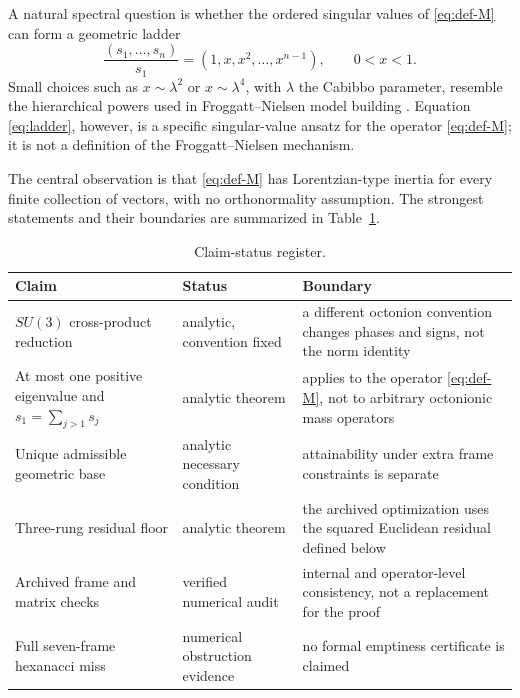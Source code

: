 \documentclass[11pt]{article}
\theoremstyle{remark}
\begin{document}
A natural spectral question is whether the ordered singular values of \eqref{eq:def-M} can form a geometric ladder
\begin{equation}
 \frac{(s_1,\ldots,s_n)}{s_1}=(1,x,x^2,\ldots,x^{n-1}),
 \qquad 0<x<1.
 \label{eq:ladder}
\end{equation}
Small choices such as $x\sim\lambda^2$ or $x\sim\lambda^4$, with $\lambda$ the Cabibbo parameter, resemble the hierarchical powers used in Froggatt--Nielsen model building \cite{FroggattNielsen1979,Wolfenstein1983}.  Equation \eqref{eq:ladder}, however, is a specific singular-value ansatz for the operator \eqref{eq:def-M}; it is not a definition of the Froggatt--Nielsen mechanism.

The central observation is that \eqref{eq:def-M} has Lorentzian-type inertia for every finite collection of vectors, with no orthonormality assumption.  The strongest statements and their boundaries are summarized in Table~\ref{tab:status}.

\begin{table}[ht]
\centering
\small
\begin{tabular}{>{\raggedright\arraybackslash}p{} >{\raggedright\arraybackslash}p{} >{\raggedright\arraybackslash}p{}}
\toprule
Claim & Status & Boundary \\
\midrule
$SU(3)$ cross-product reduction & analytic, convention fixed & a different octonion convention changes phases and signs, not the norm identity \\
\addlinespace[2pt]
At most one positive eigenvalue and $s_1=\sum_{j>1}s_j$ & analytic theorem & applies to the operator \eqref{eq:def-M}, not to arbitrary octonionic mass operators \\
\addlinespace[2pt]
Unique admissible geometric base & analytic necessary condition & attainability under extra frame constraints is separate \\
\addlinespace[2pt]
Three-rung residual floor & analytic theorem & the archived optimization uses the squared Euclidean residual defined below \\
\addlinespace[2pt]
Archived frame and matrix checks & verified numerical audit & internal and operator-level consistency, not a replacement for the proof \\
\addlinespace[2pt]
Full seven-frame hexanacci miss & numerical obstruction evidence & no formal emptiness certificate is claimed \\
\bottomrule
\end{tabular}
\caption{Claim-status register.}
\label{tab:status}
\end{table}
\end{document}
